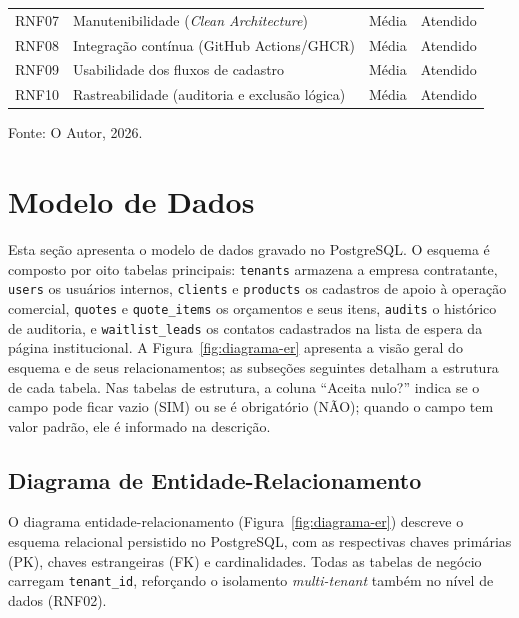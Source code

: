 \begin{table}[H]
\begin{tabular}{p{1.3cm}p{6.5cm}p{2.0cm}p{2.7cm}}
    RNF07 & Manutenibilidade (\textit{Clean Architecture}) & Média & Atendido \\
    RNF08 & Integração contínua (GitHub Actions/GHCR) & Média & Atendido \\
    RNF09 & Usabilidade dos fluxos de cadastro & Média & Atendido \\
    RNF10 & Rastreabilidade (auditoria e exclusão lógica) & Média & Atendido \\
    \hline
  \end{tabular}
  \begin{minipage}{0.95\textwidth}
    \vspace{0.3em}
    {\small Fonte: O Autor, 2026.}
  \end{minipage}
\end{table}

\section{Modelo de Dados}
\label{sec:modelo-dados}

Esta seção apresenta o modelo de dados gravado no PostgreSQL. O esquema é composto por oito tabelas principais: \texttt{tenants} armazena a empresa contratante, \texttt{users} os usuários internos, \texttt{clients} e \texttt{products} os cadastros de apoio à operação comercial, \texttt{quotes} e \texttt{quote\_items} os orçamentos e seus itens, \texttt{audits} o histórico de auditoria, e \texttt{waitlist\_leads} os contatos cadastrados na lista de espera da página institucional. A Figura~\ref{fig:diagrama-er} apresenta a visão geral do esquema e de seus relacionamentos; as subseções seguintes detalham a estrutura de cada tabela. Nas tabelas de estrutura, a coluna ``Aceita nulo?'' indica se o campo pode ficar vazio (SIM) ou se é obrigatório (NÃO); quando o campo tem valor padrão, ele é informado na descrição.

\subsection{Diagrama de Entidade-Relacionamento}
\label{sec:diagrama-er}

O diagrama entidade-relacionamento (Figura~\ref{fig:diagrama-er}) descreve o esquema relacional persistido no PostgreSQL, com as respectivas chaves primárias (PK), chaves estrangeiras (FK) e cardinalidades. Todas as tabelas de negócio carregam \texttt{tenant\_id}, reforçando o isolamento \textit{multi-tenant} também no nível de dados (RNF02).

